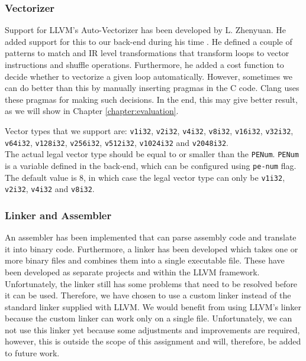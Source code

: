 \subsubsection{Vectorizer}
 Support for LLVM's Auto-Vectorizer has been developed by L. Zhenyuan. He added support for this to our back-end during his time \cite[Chapter~5]{liu_zhenyuan}. He defined a couple of patterns to match and IR level transformations that transform loops to vector instructions and shuffle operations. Furthermore, he added a cost function to decide whether to vectorize a given loop automatically. However, sometimes we can do better than this by manually inserting pragmas in the C code. Clang uses these pragmas for making such decisions. In the end, this may give better result, as we will show in Chapter \ref{chapter:evaluation}.
 
 Vector types that we support are:
 \texttt{v1i32}, \texttt{v2i32}, \texttt{v4i32}, \texttt{v8i32}, \texttt{v16i32}, \texttt{v32i32}, \texttt{v64i32}, \texttt{v128i32}, \texttt{v256i32}, \texttt{v512i32}, \texttt{v1024i32} and \texttt{v2048i32}.\\
	The actual legal vector type should be equal to or smaller than the \texttt{PENum}. \texttt{PENum} is a variable defined in the back-end, which can be configured using \texttt{pe-num} flag. The default value is 8, in which case the legal vector type can only be \texttt{v1i32}, \texttt{v2i32}, \texttt{v4i32} and \texttt{v8i32}.

\subsubsection{Linker and Assembler}
An assembler has been implemented that can parse assembly code and translate it into binary code. Furthermore, a linker has been developed which takes one or more binary files and combines them into a single executable file. These have been developed as separate projects and within the LLVM framework. Unfortunately, the linker still has some problems that need to be resolved before it can be used. %
Therefore, we have chosen to use a custom linker instead of the standard linker supplied with LLVM. We would benefit from using LLVM's linker because the custom linker can work only on a single file. Unfortunately, we can not use this linker yet because some adjustments and improvements are required, however, this is outside the scope of this assignment and will, therefore, be added to future work.%


